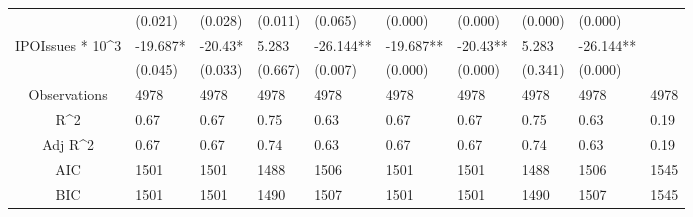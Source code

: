 \documentclass{article}
\begin{document}
\begin{table}[H]
\begin{tabular}{|clllllllll|}
   & (0.021) & (0.028) & (0.011) & (0.065) & (0.000) & (0.000) & (0.000) & (0.000) &  \\ 
  IPOIssues * 10^3 & -19.687* & -20.43* & 5.283 & -26.144** & -19.687** & -20.43** & 5.283 & -26.144** &  \\ 
   & (0.045) & (0.033) & (0.667) & (0.007) & (0.000) & (0.000) & (0.341) & (0.000) &  \\ 
  \hline 
 Observations & 4978 & 4978 & 4978 & 4978 & 4978 & 4978 & 4978 & 4978 & 4978 \\ 
  R^2 & 0.67 & 0.67 & 0.75 & 0.63 & 0.67 & 0.67 & 0.75 & 0.63 & 0.19 \\ 
  Adj R^2 & 0.67 & 0.67 & 0.74 & 0.63 & 0.67 & 0.67 & 0.74 & 0.63 & 0.19 \\ 
  AIC & 1501 & 1501 & 1488 & 1506 & 1501 & 1501 & 1488 & 1506 & 1545 \\ 
  BIC & 1501 & 1501 & 1490 & 1507 & 1501 & 1501 & 1490 & 1507 & 1545 \\ 
   \hline
\end{tabular}
 
\end{table}
\end{document}
